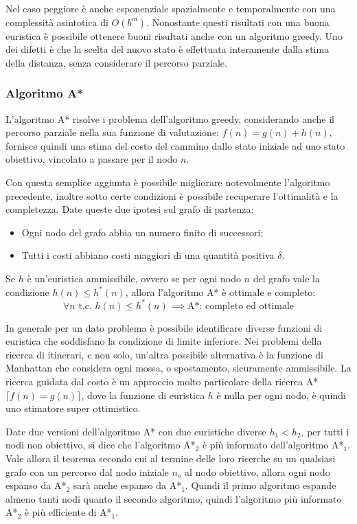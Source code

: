 \documentclass{article}
\numberwithin{equation}{subsection}
\begin{document}
Nel caso peggiore è anche esponenziale spazialmente e temporalmente con una complessità asintotica di $O(b^m)$. Nonostante questi risultati con una buona euristica è 
possibile ottenere buoni risultati anche con un algoritmo greedy. 
Uno dei difetti è che la scelta del nuovo stato è effettuata interamente dalla stima della distanza, senza considerare il percorso parziale. 

\subsubsection{Algoritmo A*}


L'algoritmo A* risolve i problema dell'algoritmo greedy, considerando anche il percorso parziale nella sua funzione di valutazione: $f(n)=g(n)+h(n)$, fornisce 
quindi una stima del costo del cammino dallo stato iniziale ad uno stato obiettivo, vincolato a passare per il nodo $n$. 

Con questa semplice aggiunta è possibile migliorare notevolmente l'algoritmo precedente, inoltre sotto certe condizioni è possibile recuperare l'ottimalità e la 
completezza. Date queste due ipotesi sul grafo di partenza:
\begin{itemize}
    \item Ogni nodo del grafo abbia un numero finito di successori;
    \item Tutti i costi abbiano costi maggiori di una quantità positiva $\delta$. 
\end{itemize}

Se $h$ è un'euristica ammissibile, ovvero se per ogni nodo $n$ del grafo vale la condizione $h(n)\leq h^*(n)$, allora l'algoritmo A* è ottimale e completo:
\begin{equation}
    \forall n\mbox{ t.c. }h(n)\leq h^*(n)\implies \text{A*: completo ed ottimale}
\end{equation}

In generale per un dato problema è possibile identificare diverse funzioni di euristica che soddisfano la condizione di limite inferiore. Nei problemi della ricerca 
di itinerari, e non solo, un'altra possibile alternativa è la funzione di Manhattan che considera ogni mossa, o spostamento, sicuramente ammissibile. La ricerca 
guidata dal costo è un approccio molto particolare della ricerca A* $\lceil f(n)=g(n)\rceil$, dove la funzione di euristica $h$ è nulla per ogni nodo, è quindi uno stimatore 
super ottimistico. 

Date due versioni dell'algoritmo A* con due euristiche diverse $h_1<h_2$, per tutti i nodi non obiettivo, si dice che l'algoritmo A*$_2$ è più informato dell'algoritmo 
A*$_1$. 
Vale allora il teorema secondo cui al termine delle loro ricerche su un qualsiasi grafo con un percorso dal nodo iniziale $n_o$ al nodo obiettivo, allora ogni nodo 
espanso da A*$_2$ sarà anche espanso da A*$_1$. Quindi il primo algoritmo espande almeno tanti nodi quanto il secondo algoritmo, quindi l'algoritmo più informato A*$_2$ 
è più efficiente di A*$_1$. 
\end{document}
